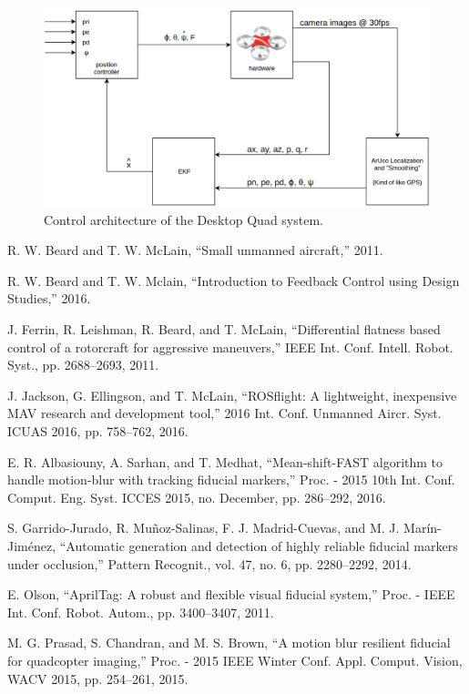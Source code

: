\documentclass[dvips,12pt]{article}
\begin{document}
\begin{figure}[H]
	\centering
	\includegraphics[width=\textwidth]{desktopquad_control_arch}
	\caption{Control architecture of the Desktop Quad system.}
	\label{fig:architecture}
\end{figure}


\begin{thebibliography}{9}
\singlespace

 R. W. Beard and T. W. McLain, “Small unmanned aircraft,” 2011.

 R. W. Beard and T. W. Mclain, “Introduction to Feedback Control using Design Studies,” 2016.

 J. Ferrin, R. Leishman, R. Beard, and T. McLain, “Differential flatness based control of a rotorcraft for aggressive maneuvers,” IEEE Int. Conf. Intell. Robot. Syst., pp. 2688–2693, 2011.

 J. Jackson, G. Ellingson, and T. McLain, “ROSflight: A lightweight, inexpensive MAV research and development tool,” 2016 Int. Conf. Unmanned Aircr. Syst. ICUAS 2016, pp. 758–762, 2016.

 E. R. Albasiouny, A. Sarhan, and T. Medhat, “Mean-shift-FAST algorithm to handle motion-blur with tracking fiducial markers,” Proc. - 2015 10th Int. Conf. Comput. Eng. Syst. ICCES 2015, no. December, pp. 286–292, 2016.

 S. Garrido-Jurado, R. Muñoz-Salinas, F. J. Madrid-Cuevas, and M. J. Marín-Jiménez, “Automatic generation and detection of highly reliable fiducial markers under occlusion,” Pattern Recognit., vol. 47, no. 6, pp. 2280–2292, 2014.

 E. Olson, “AprilTag: A robust and flexible visual fiducial system,” Proc. - IEEE Int. Conf. Robot. Autom., pp. 3400–3407, 2011.

 M. G. Prasad, S. Chandran, and M. S. Brown, “A motion blur resilient fiducial for quadcopter imaging,” Proc. - 2015 IEEE Winter Conf. Appl. Comput. Vision, WACV 2015, pp. 254–261, 2015.

\end{thebibliography}
\end{document}

